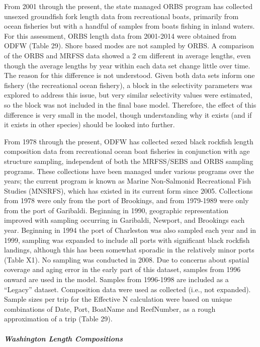 \documentclass[11pt,
  english,
  letterpaper,
]{article}
\begin{document}
From 2001 through the present, the state managed ORBS program has collected unsexed groundfish fork length data from recreational boats, primarily from ocean fisheries but with a handful of samples from boats fishing in inland waters. For this assessment, ORBS length data from 2001-2014 were obtained from ODFW (Table 29). Shore based modes are not sampled by ORBS. A comparison of the ORBS and MRFSS data showed a 2 cm different in average lengths, even though the average lengths by year within each data set change little over time. The reason for this difference is not understood. Given both data sets inform one fishery (the recreational ocean fishery), a block in the selectivity parameters was explored to address this issue, but very similar selectivity values were estimated, so the block was not included in the final base model. Therefore, the effect of this difference is very small in the model, though understanding why it exists (and if it exists in other species) should be looked into further.

From 1978 through the present, ODFW has collected sexed black rockfish length composition data from recreational ocean boat fisheries in conjunction with age structure sampling, independent of both the MRFSS/SEBS and ORBS sampling programs. These collections have been managed under various programs over the years; the current program is known as Marine Non-Salmonid Recreational Fish Studies (MNSRFS), which has existed in its current form since 2005. Collections from 1978 were only from the port of Brookings, and from 1979-1989 were only from the port of Garibaldi. Beginning in 1990, geographic representation improved with sampling occurring in Garibaldi, Newport, and Brookings each year. Beginning in 1994 the port of Charleston was also sampled each year and in 1999, sampling was expanded to include all ports with significant black rockfish landings, although this has been somewhat sporadic in the relatively minor ports (Table X1). No sampling was conducted in 2008. Due to concerns about spatial coverage and aging error in the early part of this dataset, samples from 1996 onward are used in the model. Samples from 1996-1998 are included as a ``Legacy'' dataset. Composition data were used as collected (i.e., not expanded). Sample sizes per trip for the Effective N calculation were based on unique combinations of Date, Port, BoatName and ReefNumber, as a rough approximation of a trip (Table 29).

\hypertarget{washington-length-compositions}{%
\subparagraph{Washington Length Compositions}\label{washington-length-compositions}}
\end{document}
